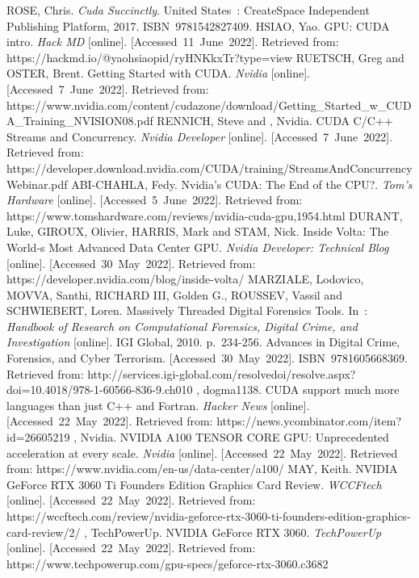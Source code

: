 \begin{thebibliography}{45}
	ROSE, Chris. \textit{Cuda Succinctly}. United States : CreateSpace Independent Publishing Platform, 2017. ISBN 9781542827409.
	HSIAO, Yao. GPU: CUDA intro. \textit{Hack MD} [online]. [Accessed 11 June 2022]. Retrieved from: https://hackmd.io/@yaohsiaopid/ryHNKkxTr?type=view
	RUETSCH, Greg and OSTER, Brent. Getting Started with CUDA. \textit{Nvidia} [online]. [Accessed 7 June 2022]. Retrieved from: https://www.nvidia.com/content/cudazone/download/Getting\_Started\_w\_CUDA\_Training\_NVISION08.pdf
	RENNICH, Steve and , Nvidia. CUDA C/C++ Streams and Concurrency. \textit{Nvidia Developer} [online]. [Accessed 7 June 2022]. Retrieved from: https://developer.download.nvidia.com/CUDA/training/StreamsAndConcurrencyWebinar.pdf
	ABI-CHAHLA, Fedy. Nvidia's CUDA: The End of the CPU?. \textit{Tom's Hardware} [online]. [Accessed 5 June 2022]. Retrieved from: https://www.tomshardware.com/reviews/nvidia-cuda-gpu,1954.html
	DURANT, Luke, GIROUX, Olivier, HARRIS, Mark and STAM, Nick. Inside Volta: The World-s Most Advanced Data Center GPU. \textit{Nvidia Developer: Technical Blog} [online]. [Accessed 30 May 2022]. Retrieved from: https://developer.nvidia.com/blog/inside-volta/
	MARZIALE, Lodovico, MOVVA, Santhi, RICHARD III, Golden G., ROUSSEV, Vassil and SCHWIEBERT, Loren. Massively Threaded Digital Forensics Tools. In : \textit{Handbook of Research on Computational Forensics, Digital Crime, and Investigation} [online]. IGI Global, 2010. p. 234-256. Advances in Digital Crime, Forensics, and Cyber Terrorism. [Accessed 30 May 2022]. ISBN 9781605668369. Retrieved from: http://services.igi-global.com/resolvedoi/resolve.aspx?doi=10.4018/978-1-60566-836-9.ch010
	, dogma1138. CUDA support much more languages than just C++ and Fortran. \textit{Hacker News} [online]. [Accessed 22 May 2022]. Retrieved from: https://news.ycombinator.com/item?id=26605219
	, Nvidia. NVIDIA A100 TENSOR CORE GPU: Unprecedented acceleration at every scale. \textit{Nvidia} [online]. [Accessed 22 May 2022]. Retrieved from: https://www.nvidia.com/en-us/data-center/a100/
	MAY, Keith. NVIDIA GeForce RTX 3060 Ti Founders Edition Graphics Card Review. \textit{WCCFtech} [online]. [Accessed 22 May 2022]. Retrieved from: https://wccftech.com/review/nvidia-geforce-rtx-3060-ti-founders-edition-graphics-card-review/2/
	, TechPowerUp. NVIDIA GeForce RTX 3060. \textit{TechPowerUp} [online]. [Accessed 22 May 2022]. Retrieved from: https://www.techpowerup.com/gpu-specs/geforce-rtx-3060.c3682

\end{thebibliography}
